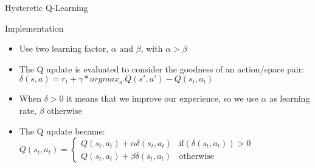 \documentclass[presentation]{beamer}\mode<presentation>{\usetheme{AMSBolognaFC}}
\begin{document}
\begin{frame}{Hysteretic Q-Learning}
	\begin{exampleblock}{Implementation}
		\begin{itemize}
			\item Use two learning factor, $\alpha$ and $\beta$, with $\alpha > \beta$
			\item The Q update is evaluated to consider the goodness of an action/space pair: $\delta(s, a) = r_t + \gamma * argmax_{a'}Q(s', a') - Q(s_t, a_t)$
			\item When $\delta > 0$ it means that we improve our experience, so we use $\alpha$ as learning rate, $\beta$ otherwise
			\item The Q update became: $ Q(s_t, a_t) =
			\begin{cases}
				Q(s_t, a_t) + \alpha{\delta(s_t, a_t)} & \text{if} (\delta(s_t, a_t)) > 0 \\
				Q(s_t, a_t) + \beta{\delta(s_t, a_t)} & \text{otherwise}
			\end{cases} $
		\end{itemize}
	\end{exampleblock}
\end{frame}
\end{document}
